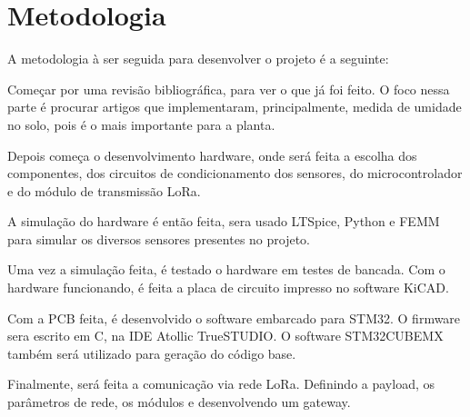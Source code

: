\chapter{Metodologia} \label{chapter:metodologia}
A metodologia à ser seguida para desenvolver o projeto é a seguinte:

Começar por uma revisão bibliográfica, para ver o que já foi feito. O foco nessa parte é procurar artigos que implementaram, principalmente, medida de umidade no solo, pois é o mais importante para a planta.

Depois começa o desenvolvimento hardware, onde será feita a escolha dos componentes, dos circuitos de condicionamento dos sensores, do microcontrolador e do módulo de transmissão LoRa.

A simulação do hardware é então feita, sera usado LTSpice, Python e FEMM para simular os diversos sensores presentes no projeto.

Uma vez a simulação feita, é testado o hardware em testes de bancada. Com o hardware funcionando, é feita a placa de circuito impresso no software KiCAD.

Com a PCB feita, é desenvolvido o software embarcado para STM32. O firmware sera escrito em C, na IDE Atollic TrueSTUDIO. O software STM32CUBEMX também será utilizado para geração do código base. 

Finalmente, será feita a comunicação via rede LoRa. Definindo a payload, os parâmetros de rede, os módulos e desenvolvendo um gateway.



